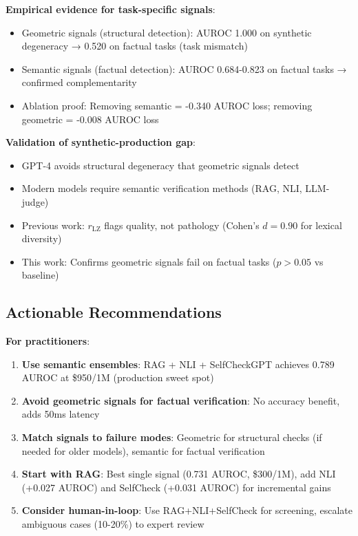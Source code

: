 \documentclass[11pt]{article}
\begin{document}
\textbf{Empirical evidence for task-specific signals}:
\begin{itemize}
\item Geometric signals (structural detection): AUROC 1.000 on synthetic degeneracy → 0.520 on factual tasks (task mismatch)
\item Semantic signals (factual detection): AUROC 0.684-0.823 on factual tasks → confirmed complementarity
\item Ablation proof: Removing semantic = -0.340 AUROC loss; removing geometric = -0.008 AUROC loss
\end{itemize}

\textbf{Validation of synthetic-production gap}:
\begin{itemize}
\item GPT-4 avoids structural degeneracy that geometric signals detect
\item Modern models require semantic verification methods (RAG, NLI, LLM-judge)
\item Previous work: $r_{\text{LZ}}$ flags quality, not pathology (Cohen's $d=0.90$ for lexical diversity)
\item This work: Confirms geometric signals fail on factual tasks ($p > 0.05$ vs baseline)
\end{itemize}

\subsection{Actionable Recommendations}

\textbf{For practitioners}:
\begin{enumerate}
\item \textbf{Use semantic ensembles}: RAG + NLI + SelfCheckGPT achieves 0.789 AUROC at \$950/1M (production sweet spot)
\item \textbf{Avoid geometric signals for factual verification}: No accuracy benefit, adds 50ms latency
\item \textbf{Match signals to failure modes}: Geometric for structural checks (if needed for older models), semantic for factual verification
\item \textbf{Start with RAG}: Best single signal (0.731 AUROC, \$300/1M), add NLI (+0.027 AUROC) and SelfCheck (+0.031 AUROC) for incremental gains
\item \textbf{Consider human-in-loop}: Use RAG+NLI+SelfCheck for screening, escalate ambiguous cases (10-20\%) to expert review
\end{enumerate}
\end{document}
